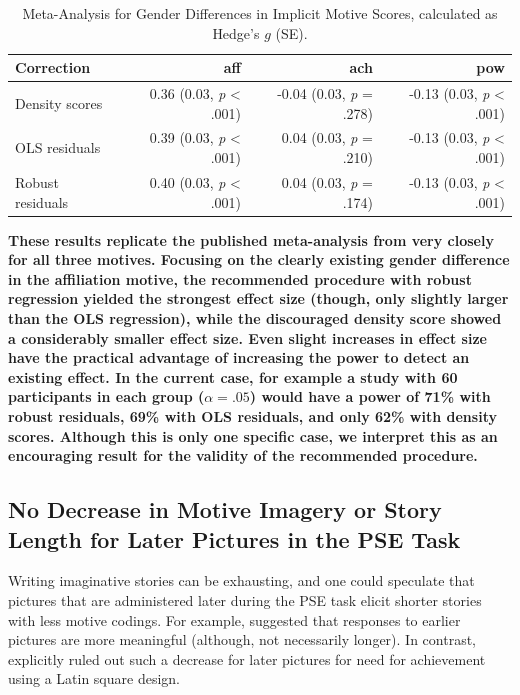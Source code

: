 \documentclass[man,a4paper,mask]{apa6}\usepackage[]{graphicx}\usepackage[]{color}
\newcommand{\added}[1]{\textcolor{colour_added}{\bf{#1}}}
\begin{document}
\begin{table}
		\caption{Meta-Analysis for Gender Differences in Implicit Motive Scores, calculated as Hedge's $g$ (SE).}
		\label{tab:MA}
		\footnotesize
		\begin{tabularx}{\textwidth}{lrrr}
		\toprule

Correction & aff & ach & pow \\ 
  \hline
Density scores & 0.36 (0.03, \emph{p} < .001) & -0.04 (0.03, \emph{p} = .278) & -0.13 (0.03, \emph{p} < .001) \\ 
  OLS residuals & 0.39 (0.03, \emph{p} < .001) & 0.04 (0.03, \emph{p} = .210) & -0.13 (0.03, \emph{p} < .001) \\ 
  Robust residuals & 0.40 (0.03, \emph{p} < .001) & 0.04 (0.03, \emph{p} = .174) & -0.13 (0.03, \emph{p} < .001) \\ 
   \hline

		\bottomrule
		\end{tabularx}
\end{table}



\added{These results replicate the published meta-analysis from \textcite{drescher_MetaanalyticEvidenceHigher_2016} very closely for all three motives. Focusing on the clearly existing gender difference in the affiliation motive, the recommended procedure with robust regression yielded the strongest effect size (though, only slightly larger than the OLS regression), while the discouraged density score showed a considerably smaller effect size. Even slight increases in effect size have the practical advantage of increasing the power to detect an existing effect. In the current case, for example a study with 60 participants in each group ($\alpha = .05$) would have a power of 71\% with robust residuals, 69\% with OLS residuals, and only 62\% with density scores. 
Although this is only one specific case, we interpret this as an encouraging result for the validity of the recommended procedure.}

\subsection{No Decrease in Motive Imagery or Story Length for Later Pictures in the PSE Task}
Writing imaginative stories can be exhausting, and one could speculate that pictures that are administered later during the PSE task elicit shorter stories with less motive codings. For example, \textcite{smith_MethodologicalConsiderationsSteps_1992} suggested that responses to earlier pictures are more meaningful (although, not necessarily longer). In contrast, \textcite[][Table 7.1]{mcclelland_achievement_1953} explicitly ruled out such a decrease for later pictures for need for achievement using a Latin square design.
\end{document}
